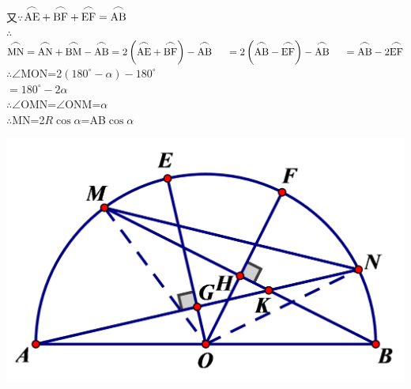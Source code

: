 \documentclass{article}
\begin{document}
    \begin{minipage}[b]{0.65\linewidth}
        又$\because $\quad ${\stackrel{{\mbox{$\Large{\frown}$}}}{\text{AE}}}+{\stackrel{{\mbox{$\Large{\frown}$}}}{\text{BF}}}+{\stackrel{{\mbox{$\Large{\frown}$}}}{\text{EF}}}={\stackrel{{\mbox{$\Large{\frown}$}}}{\text{AB}}}$ \\
        $\therefore $\quad ${\stackrel{{\mbox{$\Large{\frown}$}}}{\text{MN}}}={\stackrel{{\mbox{$\Large{\frown}$}}}{\text{AN}}}+{\stackrel{{\mbox{$\Large{\frown}$}}}{\text{BM}}}
        -{\stackrel{{\mbox{$\Large{\frown}$}}}{\text{AB}}}=2\left({\stackrel{{\mbox{$\Large{\frown}$}}}{\text{AE}}}+{\stackrel{{\mbox{$\Large{\frown}$}}}{\text{BF}}}\right) -{\stackrel{{\mbox{$\Large{\frown}$}}}{\text{AB}}} \\
        \hspace*{0.5cm} =2\left({\stackrel{{\mbox{$\Large{\frown}$}}}{\text{AB}}}-{\stackrel{{\mbox{$\Large{\frown}$}}}{\text{EF}}}\right) -{\stackrel{{\mbox{$\Large{\frown}$}}}{\text{AB}}} \\
        \hspace*{0.5cm} ={\stackrel{{\mbox{$\Large{\frown}$}}}{\text{AB}}}-2{\stackrel{{\mbox{$\Large{\frown}$}}}{\text{EF}}}$\\
        $\therefore $\quad $\angle $MON=2$\left( 180^{\circ }-\alpha\right) -180^{\circ }$\\
        \hspace*{0.5cm} $=180^{\circ }-2\alpha $\\
        $\therefore $\quad $\angle $OMN=$\angle $ONM=$\alpha $ \\
        $\therefore $\quad MN=2$R\cos\alpha $=AB$\cos\alpha $
    \end{minipage}
    \hfill
    \begin{minipage}[b]{0.35\linewidth}
        \includegraphics[scale=0.2]{4fuzhu.png}
    \end{minipage}
\end{document}
